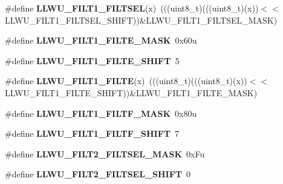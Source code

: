 \begin{DoxyCompactItemize}
\#define {\bfseries L\+L\+W\+U\+\_\+\+F\+I\+L\+T1\+\_\+\+F\+I\+L\+T\+S\+EL}(x)~(((uint8\+\_\+t)(((uint8\+\_\+t)(x))$<$$<$L\+L\+W\+U\+\_\+\+F\+I\+L\+T1\+\_\+\+F\+I\+L\+T\+S\+E\+L\+\_\+\+S\+H\+I\+FT))\&L\+L\+W\+U\+\_\+\+F\+I\+L\+T1\+\_\+\+F\+I\+L\+T\+S\+E\+L\+\_\+\+M\+A\+SK)
\item 
\mbox{\label{group___l_l_w_u___register___masks_gae449f984f9cfeec99ab8380e356b57c7}} 
\#define {\bfseries L\+L\+W\+U\+\_\+\+F\+I\+L\+T1\+\_\+\+F\+I\+L\+T\+E\+\_\+\+M\+A\+SK}~0x60u
\item 
\mbox{\label{group___l_l_w_u___register___masks_ga0d4b7527c910e60bdf1f52e51b1c0932}} 
\#define {\bfseries L\+L\+W\+U\+\_\+\+F\+I\+L\+T1\+\_\+\+F\+I\+L\+T\+E\+\_\+\+S\+H\+I\+FT}~5
\item 
\mbox{\label{group___l_l_w_u___register___masks_ga2eb83c2856ca0d1d7ff09384809aed2f}} 
\#define {\bfseries L\+L\+W\+U\+\_\+\+F\+I\+L\+T1\+\_\+\+F\+I\+L\+TE}(x)~(((uint8\+\_\+t)(((uint8\+\_\+t)(x))$<$$<$L\+L\+W\+U\+\_\+\+F\+I\+L\+T1\+\_\+\+F\+I\+L\+T\+E\+\_\+\+S\+H\+I\+FT))\&L\+L\+W\+U\+\_\+\+F\+I\+L\+T1\+\_\+\+F\+I\+L\+T\+E\+\_\+\+M\+A\+SK)
\item 
\mbox{\label{group___l_l_w_u___register___masks_gabdb5ca902522996074a75ed08a7a8b03}} 
\#define {\bfseries L\+L\+W\+U\+\_\+\+F\+I\+L\+T1\+\_\+\+F\+I\+L\+T\+F\+\_\+\+M\+A\+SK}~0x80u
\item 
\mbox{\label{group___l_l_w_u___register___masks_ga359dd7a99c209dc7c2f26d79c061d11e}} 
\#define {\bfseries L\+L\+W\+U\+\_\+\+F\+I\+L\+T1\+\_\+\+F\+I\+L\+T\+F\+\_\+\+S\+H\+I\+FT}~7
\item 
\mbox{\label{group___l_l_w_u___register___masks_gae610069172bf4a4b8f783d54faf97496}} 
\#define {\bfseries L\+L\+W\+U\+\_\+\+F\+I\+L\+T2\+\_\+\+F\+I\+L\+T\+S\+E\+L\+\_\+\+M\+A\+SK}~0x\+Fu
\item 
\mbox{\label{group___l_l_w_u___register___masks_ga4589e4982f58847b133e9792fac931ac}} 
\#define {\bfseries L\+L\+W\+U\+\_\+\+F\+I\+L\+T2\+\_\+\+F\+I\+L\+T\+S\+E\+L\+\_\+\+S\+H\+I\+FT}~0

\end{DoxyCompactItemize}

